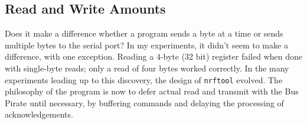\documentclass{article}
\begin{document}
\subsection*{Read and Write Amounts}

Does it make a difference whether a program sends a byte at a time or sends multiple bytes to the
serial port? In my experiments, it didn't seem to make a difference, with one exception. Reading 
a 4-byte (32 bit) register failed when done with single-byte reads; only a read of four bytes 
worked correctly. In the many experiments leading up to this discovery, the design of 
\texttt{nrftool} evolved. The philosophy of the program is now to defer actual read and transmit
with the Bus Pirate until necessary, by buffering commands and delaying the processing of 
acknowledgements. 
\end{document}
